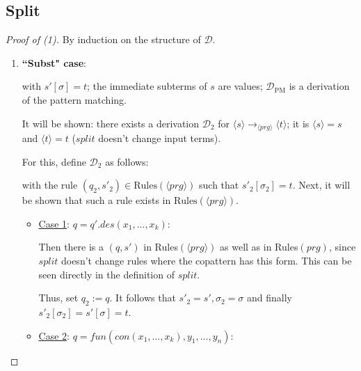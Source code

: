 \documentclass[11pt]{article} %
\begin{document}
\subsection{Split}

\begin{proof}[Proof of (1)] By induction on the structure of $\mathcal{D}$.

\begin{enumerate}
\item \textbf{``Subst" case}:

\begin{prooftree}
\end{prooftree}

with $s'[\sigma] = t$; the immediate subterms of $s$ are values; $\mathcal{D}_{\textrm{PM}}$ is a derivation of the pattern matching.

It will be shown: there exists a derivation $\mathcal{D}_2$ for $\langle s \rangle \longrightarrow_{\langle prg \rangle} \langle t \rangle$; it is $\langle s \rangle = s$ and $\langle t \rangle = t$ ($split$ doesn't change input terms).

For this, define $\mathcal{D}_2$ as follows:

\begin{prooftree}
\end{prooftree}

with the rule $(q_2, s'_2) \in \textrm{Rules}(\langle prg \rangle)$ such that $s'_2[\sigma_2] = t$. Next, it will be shown that such a rule exists in $\textrm{Rules}(\langle prg \rangle)$.

\begin{itemize}
\item \underline{Case 1}: $q = q'.des(x_1, ..., x_k)$:

Then there is a $(q, s')$ in Rules$(\langle prg \rangle)$ as well as in Rules$(prg)$, since $split$ doesn't change rules where the copattern has this form. This can be seen directly in the definition of $split$.

Thus, set $q_2 := q$. It follows that $s'_2 = s', \sigma_2 = \sigma$ and finally $s'_2[\sigma_2] = s'[\sigma] = t$.

\item \underline{Case 2}: $q = fun(con(x_1, ..., x_k), y_1, ..., y_n)$:


\end{itemize}
\end{enumerate}
\end{proof}
\end{document}
